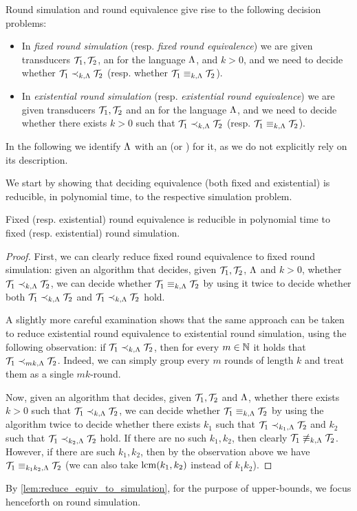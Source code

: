 Round simulation and round equivalence give rise to the following decision problems: 
\begin{itemize}
	\item In \emph{fixed round simulation} (resp. \emph{fixed round equivalence}) we are given transducers $\mathcal{T}_1,\mathcal{T}_2$, an \NFA for the language $\Lambda$, and $k>0$, and we need to decide whether $\mathcal{T}_1\prec_{k,\Lambda} \mathcal{T}_2$ (resp. whether $\mathcal{T}_1\equiv_{k,\Lambda}\mathcal{T}_2$).
	\item In \emph{existential round simulation} (resp. \emph{existential round equivalence}) we are given transducers $\mathcal{T}_1,\mathcal{T}_2$ and an \NFA for the language $\Lambda$, and we need to decide whether there exists $k>0$ such that $\mathcal{T}_1\prec_{k,\Lambda} \mathcal{T}_2$ (resp. $\mathcal{T}_1\equiv_{k,\Lambda}\mathcal{T}_2$). 
\end{itemize}
In the following we identify $\Lambda$ with an \NFA (or \DFA) for it, as we do not explicitly rely on its description.

We start by showing that deciding equivalence (both fixed and existential) is reducible, in polynomial time, to the respective simulation problem.
\begin{lemma}
	\label{lem:reduce_equiv_to_simulation}
Fixed (resp. existential) round equivalence is reducible in polynomial time to fixed (resp. existential) round simulation.
\end{lemma}
\begin{proof}
First, we can clearly reduce fixed round equivalence to fixed round simulation: given an algorithm that decides, given $\mathcal{T}_1,\mathcal{T}_2$, $\Lambda$ and $k>0$, whether $\mathcal{T}_1\prec_{k,\Lambda} \mathcal{T}_2$, we can decide whether $\mathcal{T}_1\equiv_{k,\Lambda} \mathcal{T}_2$ by using it twice to decide whether both $\mathcal{T}_1\prec_{k,\Lambda} \mathcal{T}_2$ and $\mathcal{T}_1\prec_{k,\Lambda} \mathcal{T}_2$ hold. 

A slightly more careful examination shows that the same approach can be taken to reduce existential round equivalence to existential round simulation, using the following observation: if $\mathcal{T}_1\prec_{k,\Lambda} \mathcal{T}_2$, then for every $m\in \mathbb{N}$ it holds that $\mathcal{T}_1\prec_{mk,\Lambda}\mathcal{T}_2$. Indeed, we can simply group every $m$ rounds of length $k$ and treat them as a single $mk$-round.

Now, given an algorithm that decides, given $\mathcal{T}_1,\mathcal{T}_2$ and $\Lambda$, whether there exists $k>0$ such that $\mathcal{T}_1\prec_{k,\Lambda} \mathcal{T}_2$, we can decide whether $\mathcal{T}_1\equiv_{k,\Lambda} \mathcal{T}_2$ by using the algorithm twice to decide whether there exists $k_1$ such that $\mathcal{T}_1\prec_{k_1,\Lambda} \mathcal{T}_2$ and $k_2$ such that $\mathcal{T}_1\prec_{k_2,\Lambda} \mathcal{T}_2$ hold. If there are no such $k_1,k_2$, then clearly $\mathcal{T}_1 \not\equiv_{k,\Lambda} \mathcal{T}_2$. However, if there are such $k_1,k_2$, then by the observation above we have $\mathcal{T}_1\equiv_{k_1k_2,\Lambda}\mathcal{T}_2$ (we can also take ${\rm lcm}(k_1,k_2)$ instead of $k_1k_2$).
\end{proof}
 
By \autoref{lem:reduce_equiv_to_simulation}, for the purpose of upper-bounds, we focus henceforth on round simulation.
